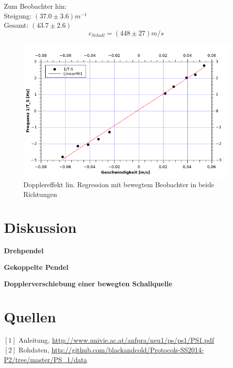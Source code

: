 \documentclass[12pt,a4paper]{article}
\begin{document}
\begin{multicols}{2}
\noindent Zum Beobachter hin:\\
Steigung: $(37.0 \pm 3.6) m^{-1}$\\

\noindent Gesamt: $(43.7 \pm 2.6)$
$$c_{Schall} = (448 \pm 27) m/s$$
\end{multicols}
\begin{figure}[H]
	\centering
	\includegraphics[scale=2.3]{./figure/Dopplereffekt.png}
	\caption{Dopplereffekt lin. Regression mit bewegtem Beobachter in beide Richtungen}
	\label{fig:doppler}
\end{figure}
\begin{multicols}{2}


\pagebreak
\section{Diskussion}
\textbf{Drehpendel}

\textbf{Gekoppelte Pendel}

\textbf{Dopplerverschiebung einer bewegten Schallquelle}


\section{Quellen}
$[1]$ Anleitung, \url{http://www.univie.ac.at/anfpra/neu1/ps/ps1/PS1.pdf}\\
$[2]$ Rohdaten, \url{htts://github.com/blackandcold/Protocols-SS2014-P2/tree/master/PS_1/data}\\

\end{multicols}
\end{document}
